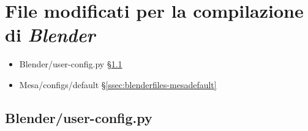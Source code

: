 
\section{File modificati per la compilazione di \emph{Blender}} \label{sec:blenderfiles}

\begin{itemize}
\item{Blender/user-config.py} \S\ref{ssec:blenderfiles-blenderuserconfig}
\item{Mesa/configs/default} \S\ref{ssec:blenderfiles-mesadefault}
\end{itemize}

\subsection{Blender/user-config.py} \label{ssec:blenderfiles-blenderuserconfig}

